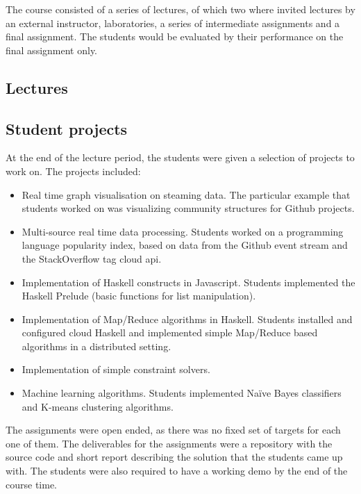 \documentclass[conference]{IEEEtran}
\begin{document}
The course consisted of a series of lectures, of which two where invited
lectures by an external instructor, laboratories, a series of intermediate
assignments and a final assignment. The students would be evaluated by their
performance on the final assignment only. 

\subsection{Lectures}

\cite{Hutto07}

\subsection{Student projects}

At the end of the lecture period, the students were given a selection of
projects to work on. The projects included:

\begin{itemize}

  \item Real time graph visualisation on steaming data. The
    particular example that students worked on was visualizing community
    structures for Github projects.

  \item Multi-source real time data processing. Students worked on a 
    programming language popularity index, based on data from the Github
    event stream and the StackOverflow tag cloud {\sc api}.

  \item Implementation of Haskell constructs in Javascript. Students implemented
    the Haskell Prelude (basic functions for list manipulation).

  \item Implementation of Map/Reduce algorithms in Haskell. Students installed
    and configured cloud Haskell and implemented simple Map/Reduce based
    algorithms in a distributed setting.

  \item Implementation of simple constraint solvers.
  
  \item Machine learning algorithms. Students implemented Na\"ive Bayes 
    classifiers and K-means clustering algorithms.

\end{itemize}

The assignments were open ended, as there was no fixed set of targets for
each one of them. The deliverables for the assignments were a repository
with the source code and short report describing the solution that the
students came up with. The students were also required to have a working
demo by the end of the course time.
\end{document}
